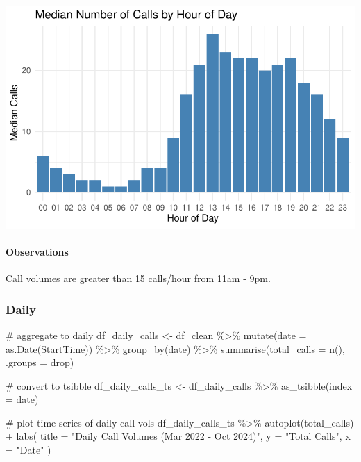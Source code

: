 \documentclass[
  letterpaper,
  DIV=11,
  numbers=noendperiod]{scrartcl}
\let\oldparagraph\paragraph
\renewcommand{\paragraph}[1]{\oldparagraph{#1}\mbox{}}
\newenvironment{Shaded}{\begin{snugshade}}{\end{snugshade}}
\newcommand{\AttributeTok}[1]{\textcolor[rgb]{0.40,0.45,0.13}{#1}}
\newcommand{\CommentTok}[1]{\textcolor[rgb]{0.37,0.37,0.37}{#1}}
\newcommand{\FunctionTok}[1]{\textcolor[rgb]{0.28,0.35,0.67}{#1}}
\newcommand{\NormalTok}[1]{\textcolor[rgb]{0.00,0.23,0.31}{#1}}
\newcommand{\OtherTok}[1]{\textcolor[rgb]{0.00,0.23,0.31}{#1}}
\newcommand{\SpecialCharTok}[1]{\textcolor[rgb]{0.37,0.37,0.37}{#1}}
\newcommand{\StringTok}[1]{\textcolor[rgb]{0.13,0.47,0.30}{#1}}
\begin{document}
\includegraphics{final_proj_group1_files/figure-pdf/hour_of_day-2.pdf}

\paragraph{Observations}\label{observations-3}

Call volumes are greater than 15 calls/hour from 11am - 9pm.

\subsubsection{Daily}\label{daily}

\begin{Shaded}
\begin{Highlighting}[]
\CommentTok{\# aggregate to daily}
\NormalTok{df\_daily\_calls }\OtherTok{\textless{}{-}}\NormalTok{ df\_clean }\SpecialCharTok{\%\textgreater{}\%}
  \FunctionTok{mutate}\NormalTok{(}\AttributeTok{date =} \FunctionTok{as.Date}\NormalTok{(StartTime)) }\SpecialCharTok{\%\textgreater{}\%}
  \FunctionTok{group\_by}\NormalTok{(date) }\SpecialCharTok{\%\textgreater{}\%}
  \FunctionTok{summarise}\NormalTok{(}\AttributeTok{total\_calls =} \FunctionTok{n}\NormalTok{(), }\AttributeTok{.groups =} \StringTok{\textquotesingle{}drop\textquotesingle{}}\NormalTok{)}

\CommentTok{\# convert to tsibble}
\NormalTok{df\_daily\_calls\_ts }\OtherTok{\textless{}{-}}\NormalTok{ df\_daily\_calls }\SpecialCharTok{\%\textgreater{}\%}
  \FunctionTok{as\_tsibble}\NormalTok{(}\AttributeTok{index =}\NormalTok{ date)}

\CommentTok{\# plot time series of daily call vols}
\NormalTok{df\_daily\_calls\_ts }\SpecialCharTok{\%\textgreater{}\%}
  \FunctionTok{autoplot}\NormalTok{(total\_calls) }\SpecialCharTok{+} 
  \FunctionTok{labs}\NormalTok{(}
    \AttributeTok{title =} \StringTok{"Daily Call Volumes (Mar 2022 {-} Oct 2024)"}\NormalTok{,}
    \AttributeTok{y =} \StringTok{"Total Calls"}\NormalTok{,}
    \AttributeTok{x =} \StringTok{"Date"}
\NormalTok{  )}
\end{Highlighting}
\end{Shaded}
\end{document}
